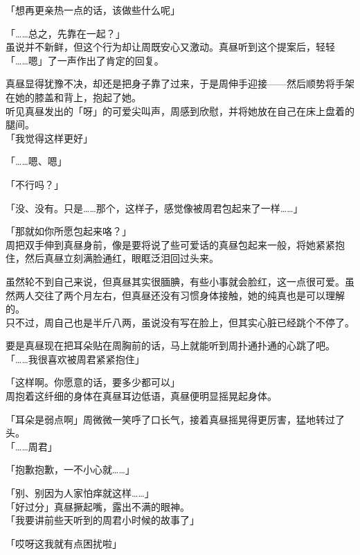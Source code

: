 「想再更亲热一点的话，该做些什么呢」

「……总之，先靠在一起？」\\

虽说并不新鲜，但这个行为却让周既安心又激动。真昼听到这个提案后，轻轻「……嗯」了一声作出了肯定的回复。

真昼显得犹豫不决，却还是把身子靠了过来，于是周伸手迎接——然后顺势将手架在她的膝盖和背上，抱起了她。\\

听见真昼发出的「呀」的可爱尖叫声，周感到欣慰，并将她放在自己在床上盘着的腿间。\\

「我觉得这样更好」

「……嗯、嗯」

「不行吗？」

「没、没有。只是……那个，这样子，感觉像被周君包起来了一样……」

「那就如你所愿包起来咯？」\\

周把双手伸到真昼身前，像是要将说了些可爱话的真昼包起来一般，将她紧紧抱住，然后真昼立刻满脸通红，眼眶泛泪回过头来。

虽然轮不到自己来说，但真昼其实很腼腆，有些小事就会脸红，这一点很可爱。虽然两人交往了两个月左右，但真昼还没有习惯身体接触，她的纯真也是可以理解的。\\

只不过，周自己也是半斤八两，虽说没有写在脸上，但其实心脏已经跳个不停了。

要是真昼现在把耳朵贴在周胸前的话，马上就能听到周扑通扑通的心跳了吧。\\

「……我很喜欢被周君紧紧抱住」

「这样啊。你愿意的话，要多少都可以」\\

周抱着这纤细的身体在真昼耳边低语，真昼便明显摇晃起身体。

「耳朵是弱点啊」周微微一笑呼了口长气，接着真昼摇晃得更厉害，猛地转过了头。\\

「……周君」

「抱歉抱歉，一不小心就……」

「别、别因为人家怕痒就这样……」\\

「好过分」真昼撅起嘴，露出不满的眼神。\\

「我要讲前些天听到的周君小时候的故事了」

「哎呀这我就有点困扰啦」\\

